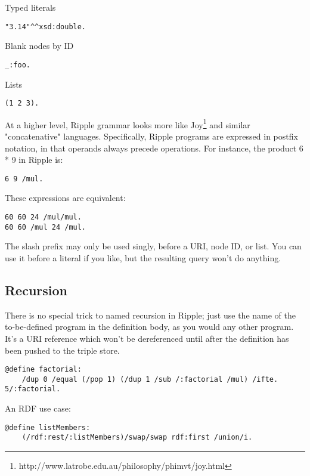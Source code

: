 \documentclass[runningheads]{llncs}
\begin{document}
Typed literals

\begin{verbatim}
"3.14"^^xsd:double.
\end{verbatim}

Blank nodes by ID

\begin{verbatim}
_:foo.
\end{verbatim}

Lists

\begin{verbatim}
(1 2 3).
\end{verbatim}

At a higher level, Ripple grammar looks more like Joy\footnote{http://www.latrobe.edu.au/philosophy/phimvt/joy.html} and similar "concatenative" languages.  Specifically, Ripple programs are expressed in postfix notation, in that operands always precede operations.  For instance, the product 6 * 9 in Ripple is:

\begin{verbatim}
6 9 /mul.
\end{verbatim}

These expressions are equivalent:

\begin{verbatim}
60 60 24 /mul/mul.
60 60 /mul 24 /mul.
\end{verbatim}

The slash prefix may only be used singly, before a URI, node ID, or list.  You can use it before a literal if you like, but the resulting query won't do anything.



\subsection{Recursion}

There is no special trick to named recursion in Ripple; just use the name of the to-be-defined program in the definition body, as you would any other program.  It's a URI reference which won't be dereferenced until after the definition has been pushed to the triple store.

\begin{verbatim}
@define factorial:
    /dup 0 /equal (/pop 1) (/dup 1 /sub /:factorial /mul) /ifte.
5/:factorial.
\end{verbatim}

An RDF use case:

\begin{verbatim}
@define listMembers:
    (/rdf:rest/:listMembers)/swap/swap rdf:first /union/i.
\end{verbatim}
\end{document}
